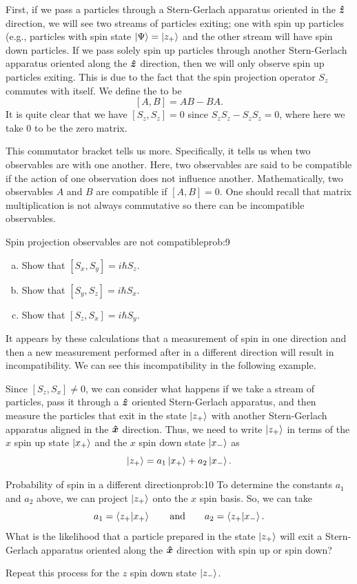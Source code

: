 \documentclass{article}
\begin{document}
First, if we pass a particles through a Stern-Gerlach apparatus oriented in the $\boldsymbol{\hat{z}}$ direction, we will see two streams of particles exiting; one with spin up particles (e.g., particles with spin state $\ket{\Psi} = \ket{z_+}$ and the other stream will have spin down particles.  If we pass solely spin up particles through another Stern-Gerlach apparatus oriented along the $\boldsymbol{\hat{z}}$ direction, then we will only observe spin up particles exiting. This is due to the fact that the spin projection operator $S_z$ commutes with itself. We define the  to be
\[
[A,B] = AB-BA.
\]
It is quite clear that we have $[S_z,S_z]=0$ since $S_zS_z-S_zS_z = 0$, where here we take 0 to be the zero matrix.

This commutator bracket  tells us more. Specifically, it tells us when two observables are  with one another.  Here, two observables are said to be compatible if the action of one observation does not influence another. Mathematically, two observables $A$ and $B$ are compatible if $[A,B]=0$. One should recall that matrix multiplication is not always commutative so there can be incompatible observables. 

\begin{problem}{Spin projection observables are not compatible}{prob:9}
\begin{enumerate}[(a)]
    \item Show that $[S_x,S_y]=i\hbar S_z$.
    \item Show that $[S_y,S_z] = i\hbar S_x$.
    \item Show that $[S_z,S_x] = i\hbar S_y$.
\end{enumerate}
\end{problem}

It appears by these calculations that a measurement of spin in one direction and then a new measurement performed after in a different direction will result in incompatibility. We can see this incompatibility in the following example.

Since $[S_z,S_x]\neq 0$, we can consider what happens if we take a stream of particles, pass it through a $\boldsymbol{\hat{z}}$ oriented Stern-Gerlach apparatus, and then measure the particles that exit in the state $\ket{z_+}$ with another Stern-Gerlach apparatus aligned in the $\boldsymbol{\hat{x}}$ direction. Thus, we need to write $\ket{z_+}$ in terms of the $x$ spin up state $\ket{x_+}$ and the $x$ spin down state $\ket{x_-}$ as
\[
\ket{z_+} = a_1 \ket{x_+} + a_2 \ket{x_-}.
\]

\begin{problem}{Probability of spin in a different direction}{prob:10}
    To determine the constants $a_1$ and $a_2$ above, we can project $\ket{z_+}$ onto the $x$ spin basis. So, we can take
    \[
        a_1 = \bra{z_+}\ket{x_+} \qquad \textrm{and} \qquad a_2 = \bra{z_+}\ket{x_-}.
    \]
    What is the likelihood that a particle prepared in the state $\ket{z_+}$ will exit a Stern-Gerlach apparatus oriented along the $\boldsymbol{\hat{x}}$ direction with spin up or spin down? 

    Repeat this process for the $z$ spin down state $\ket{z_-}$.
\end{problem}
\end{document}
